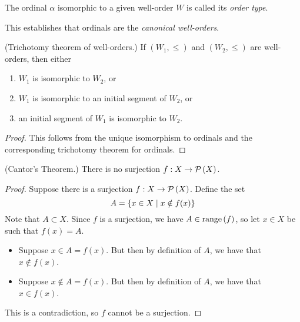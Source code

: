 \documentclass[11pt]{article}
\begin{document}
\begin{defn}
    The ordinal $\alpha$ isomorphic to a given well-order $W$ is called its
    \emph{order type}.
\end{defn}

This establishes that ordinals are the \emph{canonical well-orders}.

\begin{cor}{(Trichotomy theorem of well-orders.)}
    If $(W_1, \leq)$ and $(W_2, \leq)$ are well-orders, then either
    \begin{enumerate}
        \item $W_1$ is isomorphic to $W_2$, or
        \item $W_1$ is isomorphic to an initial segment of $W_2$, or
        \item an initial segment of $W_1$ is isomorphic to $W_2$.
    \end{enumerate}
\end{cor}

\begin{proof}
    This follows from the unique isomorphism to ordinals and the corresponding
    trichotomy theorem for ordinals.
\end{proof}

\begin{prop}{(Cantor's Theorem.)}
    There is no surjection $f : X \to \operatorname{\mathcal{P}}{\left(X\right)}$.
\end{prop}

\begin{proof}
    Suppose there is a surjection $f : X \to \operatorname{\mathcal{P}}{\left(X\right)}$.
    Define the set
    \begin{equation*}
        A = \left\{
            x \in X \;\vert\;
            x \notin f(x)
        \right\}
    \end{equation*}
    Note that $A \subset X$.
    Since $f$ is a surjection, we have $A \in \operatorname{range}{\left(f\right)}$,
    so let $x \in X$ be such that $f(x) = A$.

    \begin{itemize}
        \item
            Suppose $x \in A = f(x)$.
            But then by definition of $A$, we have that $x \notin f(x)$.
        \item
            Suppose $x \notin A = f(x)$.
            But then by definition of $A$, we have that $x \in f(x)$.
    \end{itemize}

    This is a contradiction, so $f$ cannot be a surjection.
\end{proof}
\end{document}
